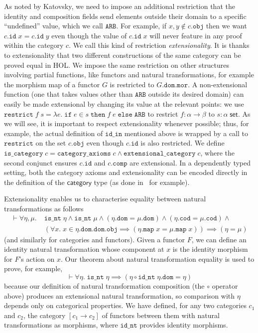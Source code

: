 \documentclass[twoside,titlepage,11pt]{article}
\begin{document}
As noted by Katovsky, we need to impose an additional restriction that the identity and composition fields send elements outside their domain to a specific ``undefined'' value, which we call $\mathtt{ARB}$.
For example, if $x,y\notin c.\mathtt{obj}$ then we want $c.\mathtt{id}\;x=c.\mathtt{id}\;y$ even though the value of $c.\mathtt{id}\;x$ will never feature in any proof within the category $c$.
We call this kind of restriction \emph{extensionality}.
It is thanks to extensionality that two different constructions of the same category can be proved equal in HOL.
We impose the same restriction on other structures involving partial functions, like functors and natural transformations, for example the morphism map of a functor $G$ is restricted to $G.\mathtt{dom}.\mathtt{mor}$.
A non-extensional function (one that takes values other than $\mathtt{ARB}$ outside its desired domain) can easily be made extensional by changing its value at the relevant points: we use $\mathtt{restrict}\;f\;s=\lambda{e}.\;\mathtt{if}\;e\in s\;\mathtt{then}\;f\;e\;\mathtt{else}\;\mathtt{ARB}$ to restrict $f:\alpha\to\beta$ to $s:\alpha\;\mathsf{set}$.
As we will see, it is important to respect extensionality whenever possible; thus, for example, the actual definition of $\mathtt{id\_in}$ mentioned above is wrapped by a call to $\mathtt{restrict}$ on the set $c.\mathtt{obj}$ even though $c.\mathtt{id}$ is also restricted.
We define $\mathtt{is\_category}\;c=\mathtt{category\_axioms}\;c\land\mathtt{extensional\_category}\;c$, where the second conjunct ensures $c.\mathtt{id}$ and $c.\mathtt{comp}$ are extensional.
In a dependently typed setting, both the category axioms and extensionality can be encoded directly in the definition of the $\mathsf{category}$ type (as done in~\cite{DBLP:conf/birthday/HuetS00,Sozeau,Megacz} for example).

Extensionality enables us to characterise equality between natural transformations as follows
\begin{align*}
\vdash\forall{\eta,\mu}.\;&\mathtt{is\_nt}\;\eta\land\mathtt{is\_nt}\;\mu\land(\eta.\mathtt{dom} = \mu.\mathtt{dom})\land(\eta.\mathtt{cod} = \mu.\mathtt{cod})\land{}\\
&(\forall{x}.\;x\in \eta.\mathtt{dom}.\mathtt{dom}.\mathtt{obj}\implies(\eta.\mathtt{map}\;x= \mu.\mathtt{map}\;x))\implies (\eta = \mu)
\end{align*}
(and similarly for categories and functors).
Given a functor $F$, we can define an identity natural transformation whose component at $x$ is the identity morphism for $F$'s action on $x$.
Our theorem about natural transformation equality is used to prove, for example, 
\[\vdash\forall{\eta}.\;\mathtt{is\_nt}\;\eta\implies(\eta\circ\mathtt{id\_nt}\;\eta.\mathtt{dom} = \eta)\]
because our definition of natural transformation composition (the $\circ$ operator above) produces an extensional natural transformation, so comparison with $\eta$ depends only on categorical properties.
We have defined, for any two categories $c_1$ and $c_2$, the category $[c_1\to c_2]$ of functors between them with natural transformations as morphisms, where $\mathtt{id\_nt}$ provides identity morphisms.
\end{document}
